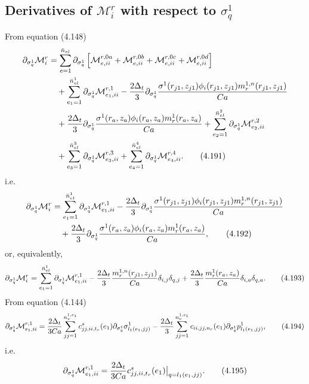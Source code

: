 \documentclass{article}
\begin{document}
\subsection{Derivatives of $\mathcal{M}_i^r$ with respect to $\sigma_q^1$} %
From equation (4.148)
\begin{align}
\partial_{\sigma_q^1}\mathcal{M}_i^r &= \sum_{e=1}^{\bar{n}_{el}} \partial_{\sigma_q^1} \left[ \mathcal{M}_{e,ii}^{r,0a} + \mathcal{M}_{e,ii}^{r,0b} + \mathcal{M}_{e,ii}^{r,0c} + \mathcal{M}_{e,ii}^{r,0d} \right] \nonumber\\
&\quad + \sum_{e_1=1}^{\bar{n}_{el}^1} \partial_{\sigma_q^1} \mathcal{M}_{e_1,ii}^{r,1} 
- \frac{2\Delta_t}{3} \partial_{\sigma_q^1} \frac{\sigma^1(r_{j1},z_{j1}) \phi_i(r_{j1},z_{j1}) m_r^{1,n}(r_{j1},z_{j1})}{Ca} \nonumber\\
&\quad + \frac{2\Delta_t}{3} \partial_{\sigma_q^1} \frac{\sigma^1(r_a,z_a) \phi_i(r_a,z_a) m_r^{1}(r_a,z_a)}{Ca} 
+ \sum_{e_2=1}^{\bar{n}_{el}^2} \partial_{\sigma_q^1} \mathcal{M}_{e_2,ii}^{r,2} \nonumber\\
&\quad + \sum_{e_3=1}^{\bar{n}_{el}^3} \partial_{\sigma_q^1} \mathcal{M}_{e_3,ii}^{r,3} 
+ \sum_{e_4=1}^{\bar{n}_{el}^4} \partial_{\sigma_q^1} \mathcal{M}_{e_4,ii}^{r,4}. \tag{4.191}
\end{align}
i.e.
\begin{align}
\partial_{\sigma_q^1}\mathcal{M}_i^r &= \sum_{e_1=1}^{\bar{n}_{el}^1} \partial_{\sigma_q^1} \mathcal{M}_{e_1,ii}^{r,1} 
- \frac{2\Delta_t}{3} \partial_{\sigma_q^1} \frac{\sigma^1(r_{j1},z_{j1}) \phi_i(r_{j1},z_{j1}) m_r^{1,n}(r_{j1},z_{j1})}{Ca} \nonumber\\
&\quad + \frac{2\Delta_t}{3} \partial_{\sigma_q^1} \frac{\sigma^1(r_a,z_a) \phi_i(r_a,z_a) m_r^{1}(r_a,z_a)}{Ca}, \tag{4.192}
\end{align}
or, equivalently,
\begin{equation}
\partial_{\sigma_q^1}\mathcal{M}_i^r = \sum_{e_1=1}^{\bar{n}_{el}^1} \partial_{\sigma_q^1} \mathcal{M}_{e_1,ii}^{r,1} 
- \frac{2\Delta_t}{3} \frac{m_r^{1,n}(r_{j1},z_{j1})}{Ca} \delta_{i,j} \delta_{q,j} 
+ \frac{2\Delta_t}{3} \frac{m_r^{1}(r_a,z_a)}{Ca} \delta_{i,a} \delta_{q,a}. \tag{4.193}
\end{equation}
From equation (4.144)
\begin{equation}
\partial_{\sigma_q^1}\mathcal{M}_{e_1,ii}^{r,1} = \frac{2\Delta_t}{3Ca} \sum_{jj=1}^{n_v^{1,e_1}} c_{jj,ii,t_r}^s(e_1) \partial_{\sigma_q^1} \sigma_{l_1(e_1,jj)}^1 
- \frac{2\Delta_t}{3} \sum_{jj=1}^{n_v^{1,e_1}} c_{ii,jj,n_r}(e_1) \partial_{\sigma_q^1} p_{l_1(e_1,jj)}^1, \tag{4.194}
\end{equation}
i.e.
\begin{equation}
\partial_{\sigma_q^1}\mathcal{M}_{e_1,ii}^{r,1} = \frac{2\Delta_t}{3Ca} c_{jj,ii,t_r}^s(e_1) \big|_{q=l_1(e_1,jj)}. \tag{4.195}
\end{equation}
\end{document}
